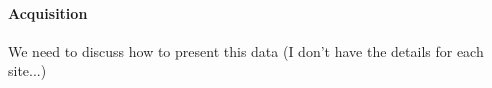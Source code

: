 \documentclass[authoryear]{elsarticle}
\begin{document}
\paragraph{Acquisition} %

We need to discuss how to present this data (I don't have the details for each site...)
\end{document}
